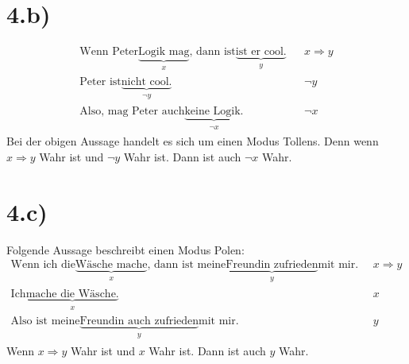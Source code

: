 \documentclass[10pt,ngerman]{scrartcl}
\begin{document}
\section{4.b)}
\setcounter{equation}{0}
\begin{align*}
\text{Wenn Peter} \underbrace{\text{Logik mag}}_{\substack{x}}\text{, dann ist} \underbrace{\text{ist er cool.}}_{\substack{y}} && x \Rightarrow y\\
\text{Peter ist}\underbrace{\text{nicht cool.}}_{\substack{\neg y}} && \neg y\\
\text{Also, mag Peter auch} \underbrace{\text{keine Logik.}}_{\substack{\neg x}} && \neg x
\end{align*}
Bei der obigen Aussage handelt es sich um einen Modus Tollens. Denn wenn $ x \Rightarrow y $ Wahr ist und $\neg y$ Wahr ist. Dann ist auch $\neg x$ Wahr.
\section{4.c)}
Folgende Aussage beschreibt einen Modus Polen:
\setcounter{equation}{0}
\begin{align*}
\text{Wenn ich die}\underbrace{\text{Wäsche mache}}_{\substack{x}}\text{, dann ist meine}\underbrace{\text{Freundin zufrieden}}_{\substack{y}}\text{mit mir.} && x \Rightarrow y\\
\text{Ich}\underbrace{\text{mache die Wäsche.}}_{\substack{x}} && x\\
\text{Also ist meine}\underbrace{\text{Freundin auch zufrieden}}_{\substack{y}}\text{mit mir.} && y
\end{align*}
Wenn $x \Rightarrow y$ Wahr ist und $x$ Wahr ist. Dann ist auch $y$ Wahr.
\pagebreak
\end{document}
